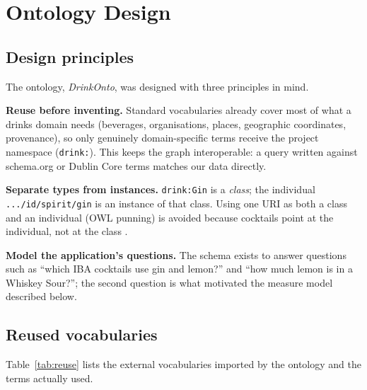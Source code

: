 \section{Ontology Design}
\label{sec:ontology}

\subsection{Design principles}

The ontology, \emph{DrinkOnto}, was designed with three principles in mind.

\textbf{Reuse before inventing.} Standard vocabularies already cover most of
what a drinks domain needs (beverages, organisations, places, geographic
coordinates, provenance), so only genuinely domain-specific terms receive the
project namespace (\texttt{drink:}). This keeps the graph interoperable: a
query written against schema.org or Dublin Core terms matches our data directly.

\textbf{Separate types from instances.} \texttt{drink:Gin} is a \emph{class};
the individual \texttt{.../id/spirit/gin} is an instance of that class. Using
one URI as both a class and an individual (OWL punning) is avoided because
cocktails point at the individual, not at the class \cite{owl2}.

\textbf{Model the application's questions.} The schema exists to answer
questions such as ``which IBA cocktails use gin and lemon?'' and ``how much
lemon is in a Whiskey Sour?''; the second question is what motivated the
measure model described below.

\subsection{Reused vocabularies}

Table~\ref{tab:reuse} lists the external vocabularies imported by the ontology
and the terms actually used.

